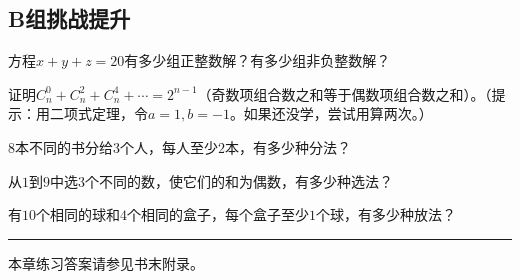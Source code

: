 \subsection*{B组\quad 挑战提升}

\begin{exercise}
\item 方程$x+y+z=20$有多少组正整数解？有多少组非负整数解？
\item 证明$C_n^0 + C_n^2 + C_n^4 + \cdots = 2^{n-1}$（奇数项组合数之和等于偶数项组合数之和）。（提示：用二项式定理，令$a=1,b=-1$。如果还没学，尝试用算两次。）
\item $8$本不同的书分给$3$个人，每人至少$2$本，有多少种分法？
\item 从$1$到$9$中选$3$个不同的数，使它们的和为偶数，有多少种选法？
\item 有$10$个相同的球和$4$个相同的盒子，每个盒子至少$1$个球，有多少种放法？
\end{exercise}

\vfill
\noindent\rule{\textwidth}{0.4pt}
本章练习答案请参见书末附录。
